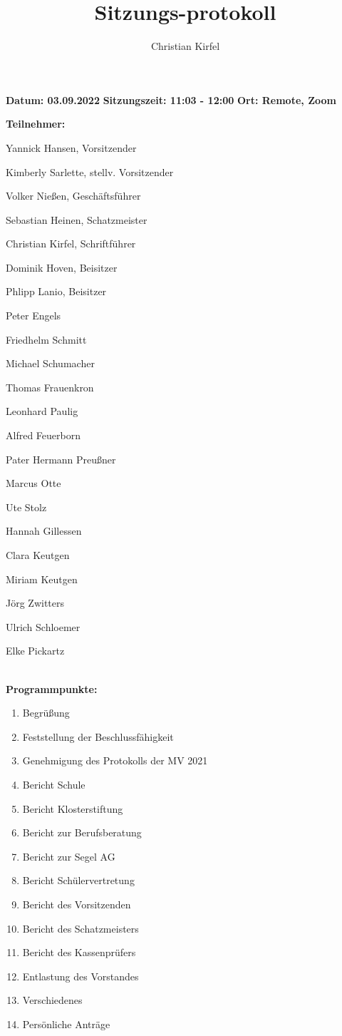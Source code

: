 \documentclass[a4paper, 11pt]{article}
\title{Sitzungs-protokoll}
\author{Christian Kirfel}
\begin{document}
\pagestyle{style1}

\textbf{Datum: 03.09.2022} %
\textbf{Sitzungszeit: 11:03 - 12:00}
\textbf{Ort: Remote, Zoom} %

\textbf{Teilnehmer:} %
\begin{description}
\item Yannick Hansen, Vorsitzender
\item Kimberly Sarlette, stellv. Vorsitzender
\item Volker Nießen, Geschäftsführer
\item Sebastian Heinen, Schatzmeister
\item Christian Kirfel, Schriftführer
\item Dominik Hoven, Beisitzer
\item Phlipp Lanio, Beisitzer
\item Peter Engels
\item Friedhelm Schmitt
\item Michael Schumacher
\item Thomas Frauenkron
\item Leonhard Paulig
\item Alfred Feuerborn
\item Pater Hermann Preußner
\item Marcus Otte
\item Ute Stolz
\item Hannah Gillessen
\item Clara Keutgen
\item Miriam Keutgen
\item Jörg Zwitters
\item Ulrich Schloemer
\item Elke Pickartz
\end{description}

\newpage

\makebox[\linewidth]{\rule{\linewidth}{0.4pt}}\\
\textbf{Programmpunkte:} 
\begin{enumerate}
\item Begrüßung
\item Feststellung der Beschlussfähigkeit
\item Genehmigung des Protokolls der MV 2021
\item Bericht Schule
\item Bericht Klosterstiftung
\item Bericht zur Berufsberatung
\item Bericht zur Segel AG
\item Bericht Schülervertretung
\item Bericht des Vorsitzenden
\item Bericht des Schatzmeisters
\item Bericht des Kassenprüfers
\item Entlastung des Vorstandes
\item Verschiedenes
\item Persönliche Anträge
\end{enumerate}
\makebox[\linewidth]{\rule{\linewidth}{0.4pt}}\\
\end{document}
